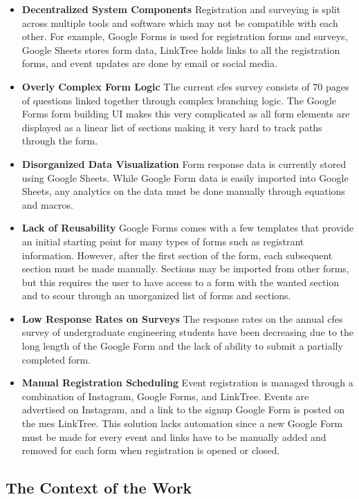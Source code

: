 \documentclass[12pt]{article}
\begin{document}
\begin{itemize}
  \item \textbf{Decentralized System Components} Registration and surveying is split across multiple tools and
    software which may not be compatible with each other. For example, Google Forms is used for registration forms and
    surveys, Google Sheets stores form data, LinkTree holds links to all the registration forms, and event updates are
    done by email or social media.
  \item \textbf{Overly Complex Form Logic} The current \gls{cfes} survey consists of 70 pages of questions linked
    together through complex branching logic. The Google Forms form building UI makes this very complicated as all form
    elements are displayed as a linear list of sections making it very hard to track paths through the form.
  \item \textbf{Disorganized Data Visualization} Form response data is currently stored using Google Sheets. While
    Google Form data is easily imported into Google Sheets, any analytics on the data must be done manually through
    equations and macros.
  \item \textbf{Lack of Reusability} Google Forms comes with a few templates that provide an initial starting point for
    many types of forms such as registrant information. However, after the first section of the form, each subsequent
    section must be made manually. Sections may be imported from other forms, but this requires the user to have access
    to a form with the wanted section and to scour through an unorganized list of forms and sections.
  \item \textbf{Low Response Rates on Surveys} The response rates on the annual \gls{cfes} survey of undergraduate engineering
    students have been decreasing due to the long length of the Google Form and the lack of ability to submit a
    partially completed form.
  \item \textbf{Manual Registration Scheduling} Event registration is managed through a combination of Instagram, Google
    Forms, and LinkTree. Events are advertised on Instagram, and a link to the signup Google Form is posted on the
    \gls{mes} LinkTree. This solution lacks automation since a new Google Form must be made for every event and links
    have to be manually added and removed for each form when registration is opened or closed.
\end{itemize}

\subsection{The Context of the Work}
\end{document}
